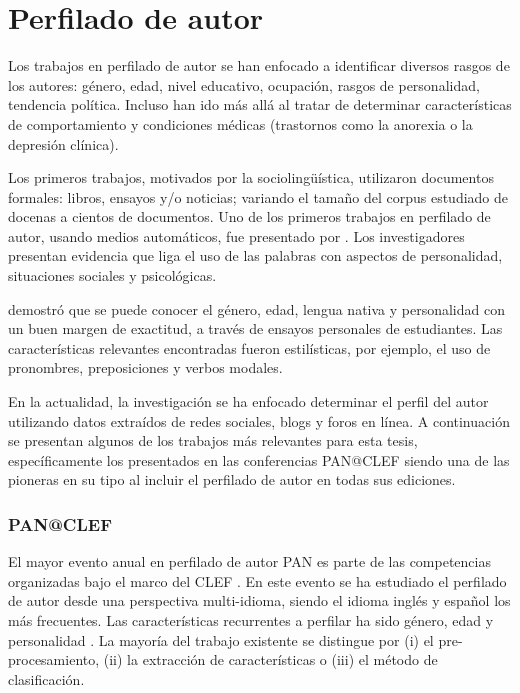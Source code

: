 \section{Perfilado de autor}
Los trabajos en perfilado de autor se han enfocado a identificar diversos rasgos de los autores: género, edad, nivel educativo, ocupación, rasgos de personalidad, tendencia política. Incluso han ido más allá al tratar de determinar características de comportamiento y condiciones médicas (trastornos como la anorexia o la depresión clínica). 

Los primeros trabajos, motivados por la sociolingüística, utilizaron documentos formales: libros, ensayos y/o noticias; variando el tamaño del corpus estudiado de docenas a cientos de documentos. 
Uno de los primeros trabajos en perfilado de autor, usando medios automáticos, fue presentado por \citep{Pennebaker2002}. Los investigadores presentan evidencia que liga el uso de las palabras con aspectos de personalidad, situaciones sociales y psicológicas.

\citep{Argamon2009} demostró que se puede conocer el género, edad, lengua nativa y personalidad con un buen margen de exactitud, a través de ensayos personales de estudiantes. Las características relevantes encontradas fueron estilísticas, por ejemplo, el uso de pronombres, preposiciones y verbos modales. 

En la actualidad, la investigación se ha enfocado determinar el perfil del autor utilizando datos extraídos de redes sociales, blogs y foros en línea. A continuación se presentan algunos de los trabajos más relevantes para esta tesis, específicamente los presentados en las conferencias PAN@CLEF siendo una de las pioneras en su tipo al incluir el perfilado de autor en todas sus ediciones.

\subsubsection{PAN@CLEF}
El mayor evento anual en perfilado de autor PAN es parte de las competencias organizadas bajo el marco del CLEF \citep{Rangel2013b, Rangel2019}. En este evento se ha estudiado el perfilado de autor desde una perspectiva multi-idioma, siendo el idioma inglés y español los más frecuentes. Las características recurrentes a perfilar ha sido género, edad y personalidad  \citep{Rangel2013b, Rangel2019, Rangel2016b, Stammatatos2015}.
La mayoría del trabajo existente se distingue por (i) el pre-procesamiento, (ii) la extracción de características o (iii) el método de clasificación.

